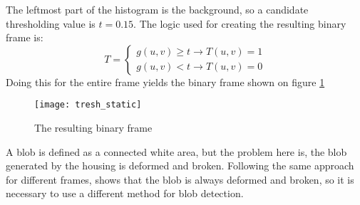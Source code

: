 The leftmost part of the histogram is the background, so a candidate thresholding value is $t=0.15$. The logic used for creating the resulting binary frame is:
\begin{equation}
T = \left\{\begin{matrix}
g(u,v)\geq t \rightarrow T(u,v)=1\\[1em]
g(u,v)<t \rightarrow T(u,v)=0
\end{matrix}    \right.
\end{equation}\clearpage
Doing this for the entire frame yields the binary frame shown on figure \ref{fig_binary_v1}
\begin{figure}[htbp]
	\centering
	\texttt{[image: tresh\_static]}
	\caption{The resulting binary frame}
	\label{fig_binary_v1}
\end{figure}
A blob is defined as a connected white area, but the problem here is, the blob generated by the housing is deformed and broken. Following the same approach for different frames, shows that the blob is always deformed and broken, so it is necessary to use a different method for blob detection.
